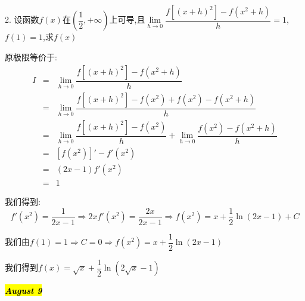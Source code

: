 2. 设函数$f(x)$在$(\dfrac{1}{2},+\infty)$上可导,且$\lim\limits_{h\rightarrow 0}\dfrac{f[(x+h)^2]-f(x^2+h)}{h}=1$,$f(1)=1$,求$f(x)$
\begin{solution}

	原极限等价于:  
	\begin{eqnarray*}
		I&=&\lim\limits_{h\rightarrow 0}\dfrac{f[(x+h)^2]-f(x^2+h)}{h}\\
		&=&\lim\limits_{h\rightarrow 0}\dfrac{f[(x+h)^2]-f(x^2)+f(x^2)-f(x^2+h)}{h}\\
		&=&\lim\limits_{h\rightarrow 0}\dfrac{f[(x+h)^2]-f(x^2)}{h}+\lim\limits_{h\rightarrow 0}\dfrac{f(x^2)-f(x^2+h)}{h}\\
		&=&[f(x^2)]'-f'(x^2)\\
		&=&(2x-1)f'(x^2)\\
		&=&1
	\end{eqnarray*}

	我们得到:  
	$$f'(x^2)=\dfrac{1}{2x-1}\Rightarrow 2xf'(x^2)=\dfrac{2x}{2x-1}\Rightarrow f(x^2)=x+\dfrac{1}{2}\ln(2x-1)+C$$
	
	我们由$f(1)=1\Rightarrow C=0\Rightarrow f(x^2)=x+\dfrac{1}{2}\ln(2x-1)$
	
	我们得到$f(x)=\sqrt{x}+\dfrac{1}{2}\ln(2\sqrt{x}-1)$
\end{solution}

\hl{\textbf{\textit{August 9}}}

